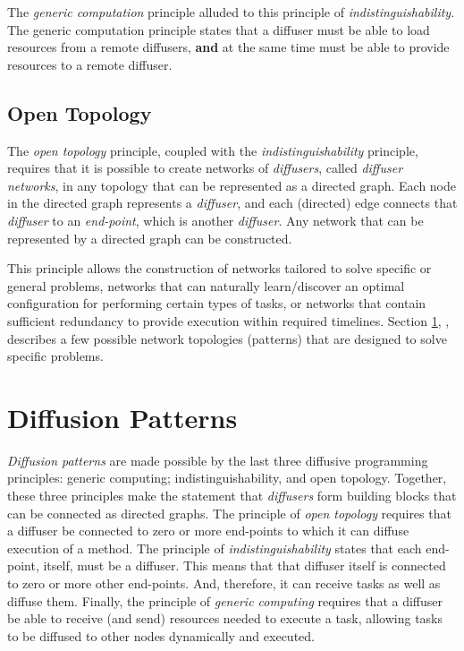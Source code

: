 \documentclass[11pt]{article}
\begin{document}
The \emph{generic computation} principle alluded to this principle of \emph{indistinguishability}. The generic computation principle states that a diffuser must be able to load resources from a remote diffusers, \textbf{and} at the same time must be able to provide resources to a remote diffuser.

\subsection{Open Topology\label{sec:open_topoloogy}}
The \emph{open topology} principle, coupled with the \emph{indistinguishability} principle, requires that it is possible to create networks of \emph{diffusers}, called \emph{diffuser networks}, in any topology that can be represented as a directed graph. Each node in the directed graph represents a \emph{diffuser}, and each (directed) edge connects that \emph{diffuser} to an \emph{end-point}, which is another \emph{diffuser}. Any network that can be represented by a directed graph can be constructed. 

This principle allows the construction of networks tailored to solve specific or general problems, networks that can naturally learn/discover an optimal configuration for performing certain types of tasks, or networks that contain sufficient redundancy to provide execution within required timelines. Section \ref{sec:diffusion_patterns}, \emph{}, describes a few possible network topologies (patterns) that are designed to solve specific problems.

%
%
\section{Diffusion Patterns}\label{sec:diffusion_patterns}
\emph{Diffusion patterns} are made possible by the last three diffusive programming principles: generic computing; indistinguishability, and open topology. Together, these three principles make the statement that \emph{diffusers} form building blocks that can be connected as directed graphs. The principle of \emph{open topology} requires that a diffuser be connected to zero or more end-points to which it can diffuse execution of a method. The principle of \emph{indistinguishability} states that each end-point, itself, must be a diffuser. This means that that diffuser itself is connected to zero or more other end-points. And, therefore, it can receive tasks as well as diffuse them. Finally, the principle of \emph{generic computing} requires that a diffuser be able to receive (and send) resources needed to execute a task, allowing tasks to be diffused to other nodes dynamically and executed.
\end{document}
